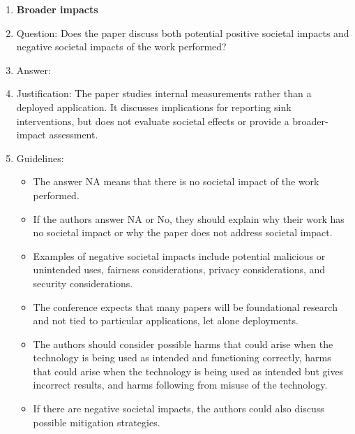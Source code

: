 \begin{enumerate}
\item {\bf Broader impacts}
    \item[] Question: Does the paper discuss both potential positive societal impacts and negative societal impacts of the work performed?
    \item[] Answer: \answerNA{}
    \item[] Justification: The paper studies internal measurements rather than a deployed application. It discusses implications for reporting sink interventions, but does not evaluate societal effects or provide a broader-impact assessment.
    \item[] Guidelines:
    \begin{itemize}
        \item The answer NA means that there is no societal impact of the work performed.
        \item If the authors answer NA or No, they should explain why their work has no societal impact or why the paper does not address societal impact.
        \item Examples of negative societal impacts include potential malicious or unintended uses, fairness considerations, privacy considerations, and security considerations.
        \item The conference expects that many papers will be foundational research and not tied to particular applications, let alone deployments.
        \item The authors should consider possible harms that could arise when the technology is being used as intended and functioning correctly, harms that could arise when the technology is being used as intended but gives incorrect results, and harms following from misuse of the technology.
        \item If there are negative societal impacts, the authors could also discuss possible mitigation strategies.
    \end{itemize}


\end{enumerate}
